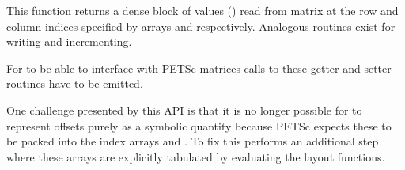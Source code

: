 \documentclass[thesis]{subfiles}
\begin{document}
This function returns a dense block of values () read from matrix  at the row and column indices specified by arrays  and  respectively.
Analogous routines exist for writing and incrementing.

For  to be able to interface with PETSc matrices calls to these getter and setter routines have to be emitted.

One challenge presented by this API is that it is no longer possible for  to represent offsets purely as a symbolic quantity because PETSc expects these to be packed into the index arrays  and .
To fix this  performs an additional step where these arrays are explicitly tabulated by evaluating the layout functions. %

\end{document}
